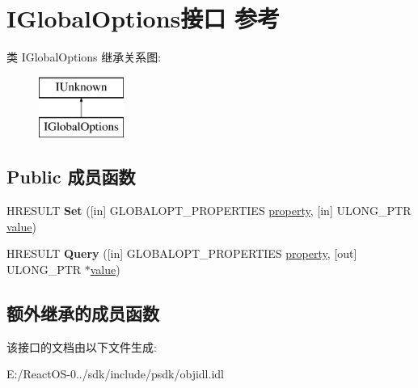 \hypertarget{interface_i_global_options}{}\section{I\+Global\+Options接口 参考}
\label{interface_i_global_options}
类 I\+Global\+Options 继承关系图\+:\begin{figure}[H]
\begin{center}
\leavevmode
\includegraphics[height=2.000000cm]{interface_i_global_options}
\end{center}
\end{figure}
\subsection*{Public 成员函数}
\begin{DoxyCompactItemize}
\item 
\mbox{\label{interface_i_global_options_a0a8763f21c398aca9c0536cfaa134e4f}} 
H\+R\+E\+S\+U\+LT {\bfseries Set} (\mbox{[}in\mbox{]} G\+L\+O\+B\+A\+L\+O\+P\+T\+\_\+\+P\+R\+O\+P\+E\+R\+T\+I\+ES \hyperlink{structproperty}{property}, \mbox{[}in\mbox{]} U\+L\+O\+N\+G\+\_\+\+P\+TR \hyperlink{unionvalue}{value})
\item 
\mbox{\label{interface_i_global_options_a37079592532df927ca8bc1dfcfcd0054}} 
H\+R\+E\+S\+U\+LT {\bfseries Query} (\mbox{[}in\mbox{]} G\+L\+O\+B\+A\+L\+O\+P\+T\+\_\+\+P\+R\+O\+P\+E\+R\+T\+I\+ES \hyperlink{structproperty}{property}, \mbox{[}out\mbox{]} U\+L\+O\+N\+G\+\_\+\+P\+TR $\ast$\hyperlink{unionvalue}{value})
\end{DoxyCompactItemize}
\subsection*{额外继承的成员函数}


该接口的文档由以下文件生成\+:\begin{DoxyCompactItemize}
\item 
E\+:/\+React\+O\+S-\/0../sdk/include/psdk/objidl.\+idl\end{DoxyCompactItemize}
